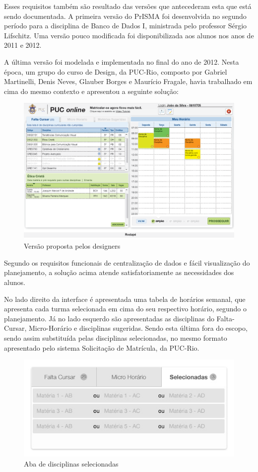 \documentclass[graduacao,brazil]{ThesisPUC}
\begin{document}
Esses requisitos também são resultado das versões que antecederam esta que está sendo documentada. A primeira versão do PrISMA foi desenvolvida no segundo período para a disciplina de Banco de Dados I, ministrada pelo professor Sérgio Lifschitz. Uma versão pouco modificada foi disponibilizada aos alunos nos anos de 2011 e 2012.  

A última versão foi modelada e implementada no final do ano de 2012. Nesta época, um grupo do curso de Design, da PUC-Rio, composto por Gabriel Martinelli, Denis Neves, Glauber Borges e Maurício Fragale, havia trabalhado em cima do mesmo contexto e apresentou a seguinte solução:

\begin{figure}[H]
    \centering
    \includegraphics[width=\linewidth]{img/designer.png}
    \caption{Versão proposta pelos designers}
\end{figure}

Segundo os requisitos funcionais de centralização de dados e fácil visualização do planejamento, a solução acima atende satisfatoriamente as necessidades dos alunos. 

No lado direito da interface é apresentada uma tabela de horários semanal, que apresenta cada turma selecionada em cima do seu respectivo horário, segundo o planejamento. Já no lado esquerdo são apresentadas as disciplinas do Falta-Cursar, Micro-Horário e disciplinas sugeridas. Sendo esta última fora do escopo, sendo assim substituída pelas disciplinas selecionadas, no mesmo formato apresentado pelo sistema Solicitação de Matrícula, da PUC-Rio.

\begin{figure}[H]
    \centering
    \includegraphics[width=0.8\linewidth]{img/selecionadas.jpg}
    \caption{Aba de disciplinas selecionadas}
\end{figure}
\end{document}
